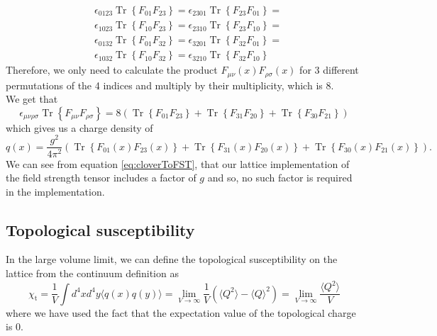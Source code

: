 \documentclass[a4paper,10pt]{book}
\begin{document}
\begin{equation*}
\begin{aligned} 
&\epsilon_{0123}\operatorname{Tr}\left\{F_{0 1} F_{2 3}\right\} = \epsilon_{2301}\operatorname{Tr}\left\{F_{2 3} F_{0 1}\right\}=\\
&\epsilon_{1023}\operatorname{Tr}\left\{F_{10} F_{2 3}\right\} = \epsilon_{2310}\operatorname{Tr}\left\{F_{23} F_{10}\right\} =\\
&\epsilon_{0132}\operatorname{Tr}\left\{F_{01} F_{32}\right\} = \epsilon_{3201}\operatorname{Tr}\left\{F_{32} F_{01}\right\} =\\
&\epsilon_{1032}\operatorname{Tr}\left\{F_{10} F_{32}\right\} = \epsilon_{3210}\operatorname{Tr}\left\{F_{32} F_{10}\right\}
\end{aligned}
\end{equation*}
Therefore, we only need to calculate the product $F_{\mu \nu}(x) F_{\rho \sigma}(x)$ for 3 different permutations of the 4 indices and multiply by their multiplicity, which is 8.\\
We get that
\begin{equation}
\epsilon_{\mu \nu \rho \sigma} \operatorname{Tr}\left\{F_{\mu \nu} F_{\rho \sigma}\right\} = 8\left( \operatorname{Tr}\left\{F_{01} F_{23}\right\} + \operatorname{Tr}\left\{F_{31} F_{20}\right\}+ \operatorname{Tr}\left\{F_{30} F_{21}\right\} \right)
\end{equation}
which gives us a charge density of 
\begin{equation}
q(x)=\frac{g^{2}}{4 \pi^{2}} \left( \operatorname{Tr}\left\{F_{01}(x) F_{23}(x)\right\} + \operatorname{Tr}\left\{F_{31}(x) F_{20}(x)\right\}+ \operatorname{Tr}\left\{F_{30}(x) F_{21}(x)\right\} \right).
\end{equation}
We can see from equation \eqref{eq:cloverToFST}, that our lattice implementation of the field strength tensor includes a factor of $g$ and so, no such factor is required in the implementation.

\subsection{Topological susceptibility}
In the large volume limit, we can define the topological susceptibility on the lattice from the continuum definition as 
\begin{equation}
\chi_{\mathrm{t}}=\frac{1}{V} \int d^{4} x d^{4} y\langle q(x) q(y)\rangle = \lim\limits_{V\rightarrow \infty}\frac{1}{V}\left( \langle Q^2 \rangle - \langle Q\rangle^2 \right) =\lim\limits_{V\rightarrow \infty} \frac{\langle Q^2 \rangle}{V}
\end{equation}
where we have used the fact that the expectation value of the topological charge is 0.
\end{document}
